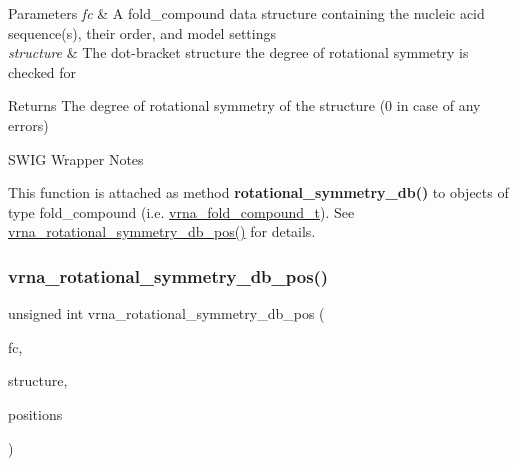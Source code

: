 \begin{DoxyParams}{Parameters}
{\em fc} & A fold\+\_\+compound data structure containing the nucleic acid sequence(s), their order, and model settings \\
\hline
{\em structure} & The dot-\/bracket structure the degree of rotational symmetry is checked for \\
\hline
\end{DoxyParams}
\begin{DoxyReturn}{Returns}
The degree of rotational symmetry of the {\ttfamily structure} (0 in case of any errors)
\end{DoxyReturn}
\begin{DoxyRefDesc}{S\+W\+I\+G Wrapper Notes}
\item[\mbox{\hyperlink{wrappers__wrappers000020}{S\+W\+I\+G Wrapper Notes}}]This function is attached as method {\bfseries{rotational\+\_\+symmetry\+\_\+db()}} to objects of type {\ttfamily fold\+\_\+compound} (i.\+e. \mbox{\hyperlink{group__fold__compound_ga1b0cef17fd40466cef5968eaeeff6166}{vrna\+\_\+fold\+\_\+compound\+\_\+t}}). See \mbox{\hyperlink{group__combinatorics__utils_ga2a4227ebe28dbc7ad55444a3a1bf7119}{vrna\+\_\+rotational\+\_\+symmetry\+\_\+db\+\_\+pos()}} for details. \end{DoxyRefDesc}
\mbox{\label{group__combinatorics__utils_ga2a4227ebe28dbc7ad55444a3a1bf7119}} 
\subsubsection{\texorpdfstring{vrna\_rotational\_symmetry\_db\_pos()}{vrna\_rotational\_symmetry\_db\_pos()}}
{\footnotesize\ttfamily unsigned int vrna\+\_\+rotational\+\_\+symmetry\+\_\+db\+\_\+pos (\begin{DoxyParamCaption}\item[{\mbox{\hyperlink{group__fold__compound_ga1b0cef17fd40466cef5968eaeeff6166}{vrna\+\_\+fold\+\_\+compound\+\_\+t}} $\ast$}]{fc,  }\item[{const char $\ast$}]{structure,  }\item[{unsigned int $\ast$$\ast$}]{positions }\end{DoxyParamCaption})}



